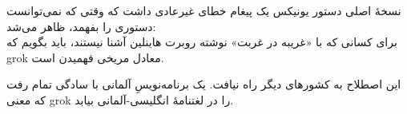 \begin{tcolorbox}
    نسخهٔ اصلی دستور  یونیکس یک پیغام خطای غیرعادی داشت که وقتی که نمی‌توانست دستوری را بفهمد، ظاهر می‌شد:
    \LTR\noindent
    \\
    \RTL
    برای کسانی که با «غریبه در غربت» نوشته روبرت هاینلین آشنا نیستند، باید بگویم که grok معادل مریخی فهمیدن است.

    این اصطلاح به کشورهای دیگر راه نیافت. یک برنامه‌نویسِ آلمانی با سادگی تمام رفت که معنی grok را در لغتنامهٔ انگلیسی-آلمانی بیابد.
\end{tcolorbox}
